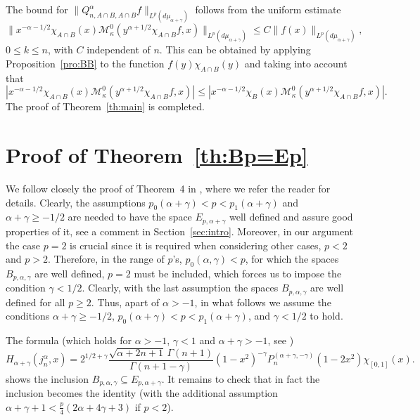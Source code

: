 \documentclass[a4paper]{amsart}
\newcommand{\calM}{\mathcal{M}}
\newcommand{\muag}{d\mu_{\alpha+\gamma}}
\begin{document}
The bound for $\|Q^\alpha_{n,A\cap B, A\cap B}f\|_{L^p(\muag)}$ follows
from the uniform estimate
\begin{equation*}
  \| x^{-\alpha-1/2}\chi_{A\cap B}(x)\calM_{\kappa}^0(y^{\alpha+1/2}
  \chi_{A\cap B}f,x) \|_{L^p(\muag)}
  \le C \| f(x) \|_{L^p(\muag)},
\end{equation*}
$0 \le k \le n$, with $C$ independent of $n$. This can be obtained  by applying
Proposition~\ref{pro:BB} to the function $f(y)\chi_{A\cap B}(y)$ and
taking into account that
\begin{equation*}
  |x^{-\alpha-1/2}\chi_{A\cap B}(x)\calM_{\kappa}^0(y^{\alpha+1/2}
    \chi_{A\cap B}f,x)|
  \le | x^{-\alpha-1/2}\chi_{B}(x)\calM_{\kappa}^0(y^{\alpha+1/2}
    \chi_{A\cap B}f,x)|.
\end{equation*}
The proof of Theorem~\ref{th:main} is completed.

\section{Proof of Theorem~\ref{th:Bp=Ep}}
\label{sec:Bp=Ep}

We follow closely the proof of Theorem~4 in \cite{CiGPV}, where we
refer the reader for details. Clearly,
the assumptions $p_{0}(\alpha+\gamma)<p<p_1(\alpha+\gamma)$
and $\alpha+\gamma\ge-1/2$ are needed to have the
space $E_{p,\alpha+\gamma}$ well defined and assure good properties of
it, see a comment in Section~\ref{sec:intro}. Moreover, in our argument the
case $p=2$ is crucial since it is required when considering other
cases, $p<2$ and $p>2$. Therefore, in the range of $p$'s, $p_0(\alpha,\gamma)<p$,
for which the spaces $B_{p,\alpha,\gamma}$ are well defined, $p=2$ must be
included, which forces us to impose the condition
$\gamma<1/2$. Clearly, with the last assumption the spaces
$B_{p,\alpha,\gamma}$ are well defined for all $p\ge 2$.
Thus, apart of $\alpha>-1$, in what follows we assume
the conditions $\alpha+\gamma\ge-1/2$,
$p_{0}(\alpha+\gamma)<p<p_1(\alpha+\gamma)$, and $\gamma<1/2$ to hold.

The formula (which holds for $\alpha>-1$, $\gamma<1$ and $\alpha+\gamma> -1$,
see \cite[Lemma~3]{CiGPV})
\begin{equation*}
  H_{\alpha+\gamma}(j_n^\alpha,x)
  = 2^{1/2+\gamma}
    \frac{\sqrt{\alpha+2n+1}\,\Gamma(n+1)}{\Gamma(n+1-\gamma)}
    (1-x^2)^{-\gamma} P_n^{(\alpha+\gamma,-\gamma)}(1-2x^2)\chi_{[0,1]}(x).
\end{equation*}
shows the inclusion $B_{p,\alpha,\gamma} \subseteq E_{p,\alpha+\gamma}$.
It remains to check that in fact
the inclusion becomes the identity (with the additional assumption
$\alpha+\gamma+1 < \frac{p}4(2\alpha+4\gamma+3)$ if $p<2$).
\end{document}
